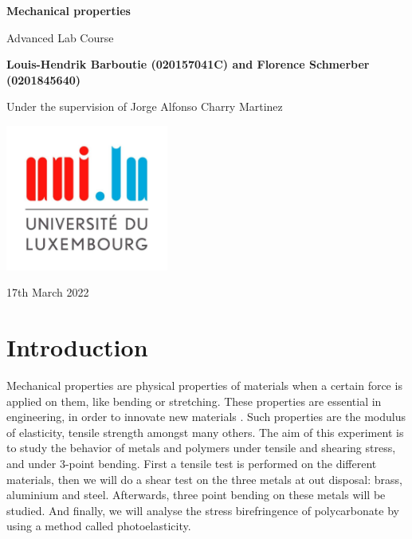 \documentclass{scrartcl}
\begin{document}
\begin{titlepage}
    \begin{center}
        \vspace*{1cm}
        \Huge
        \textbf{Mechanical properties}
        
        \vspace{0.5cm}
        \LARGE
        Advanced Lab Course
        
        \vspace{1.5cm}
        \textbf{Louis-Hendrik Barboutie (020157041C) and Florence Schmerber (0201845640)}
        
        \vspace{1cm}
        Under the supervision of Jorge Alfonso Charry Martinez
        \vfill
        

        \includegraphics[width=0.4\textwidth]{logo_uni.jpg}
        
        \Large
        17th March 2022
    \end{center}
\end{titlepage}

\clearpage

\tableofcontents

\listoffigures
	
\clearpage

\section{Introduction}
Mechanical properties are physical properties of materials when a certain force is applied on them, like bending or stretching. These properties are essential in engineering, in order to innovate new materials \cite{material}. Such properties are the modulus of elasticity, tensile strength amongst many others. The aim of this experiment is to study the behavior of metals and polymers under tensile and shearing stress, and under 3-point bending. First a tensile test is performed on the different materials, then we will do a shear test on the three metals at out disposal: brass, aluminium and steel. Afterwards, three point bending on these metals will be studied. And finally, we will analyse the stress birefringence of polycarbonate by using a method called photoelasticity.
\end{document}
